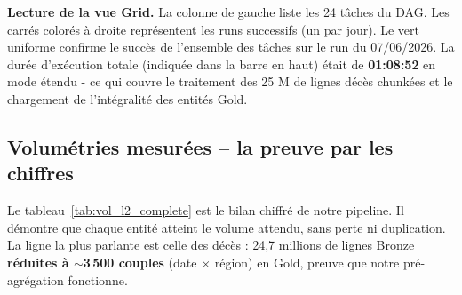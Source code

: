 \documentclass[12pt,a4paper]{report}
\begin{document}
\textbf{Lecture de la vue Grid.} La colonne de gauche liste les 24 tâches du DAG. Les carrés colorés à droite représentent les runs successifs (un par jour). Le vert uniforme confirme le succès de l'ensemble des tâches sur le run du 07/06/2026. La durée d'exécution totale (indiquée dans la barre en haut) était de \textbf{01:08:52} en mode étendu - ce qui couvre le traitement des 25 M de lignes décès chunkées et le chargement de l'intégralité des entités Gold.

\subsection{Volumétries mesurées -- la preuve par les chiffres}
Le tableau~\ref{tab:vol_l2_complete} est le bilan chiffré de notre pipeline. Il démontre que chaque entité atteint le volume attendu, sans perte ni duplication. La ligne la plus parlante est celle des décès : 24,7 millions de lignes Bronze \textbf{réduites à $\sim$3\,500 couples} (date $\times$ région) en Gold, preuve que notre pré-agrégation fonctionne.
\end{document}
